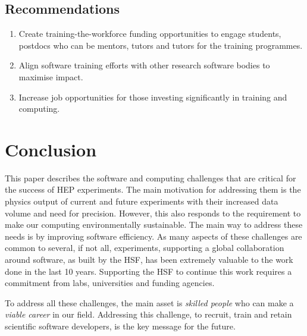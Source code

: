 \documentclass[10pt,a4paper]{article}
\begin{document}
\subsection{Recommendations}\label{recommendations-4}

\begin{enumerate}
\def\labelenumi{\arabic{enumi}.}
\item
  Create training-the-workforce funding opportunities to engage
  students, postdocs who can be mentors, tutors and tutors for the
  training programmes.
\item
  Align software training efforts with other research software bodies to
  maximise impact.
\item
  Increase job opportunities for those investing significantly in
  training and computing.
\end{enumerate}

\section{Conclusion}\label{conclusion}

This paper describes the software and computing challenges that are
critical for the success of HEP experiments. The main motivation for
addressing them is the physics output of current and future experiments
with their increased data volume and need for precision. However, this
also responds to the requirement to make our computing environmentally
sustainable. The main way to address these needs is by improving
software efficiency. As many aspects of these challenges are common to
several, if not all, experiments, supporting a global collaboration
around software, as built by the HSF, has been extremely valuable to the
work done in the last 10 years. Supporting the HSF to continue this work
requires a commitment from labs, universities and funding agencies.

To address all these challenges, the main asset is \emph{skilled people}
who can make a \emph{viable career} in our field. Addressing this
challenge, to recruit, train and retain scientific software developers,
is the key message for the future.

\sloppy
\printbibliography
\end{document}
